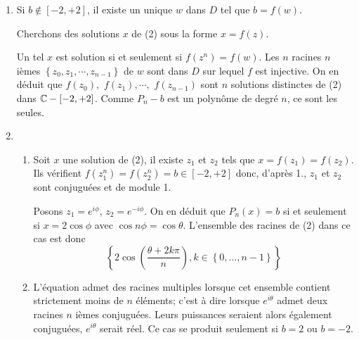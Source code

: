 \begin{enumerate}
\item  Si $b\notin \left[ -2,+2\right] $, il existe un unique $w$ dans $D$ tel que $b=f(w)$.

Cherchons des solutions $x$ de (2) sous la forme $x=f(z)$.

Un tel $x$ est solution si et seulement si $f(z^{n})=f(w)$. Les $n$ racines $n$ i{\`e}mes $\left\{ z_{0},z_{1},\cdots ,z_{n-1}\right\} $ de $w$ sont dans $D$ sur lequel $f$ est injective$.$ On en d{\'e}duit que $%
f(z_{0}), $ $f(z_{1}),\cdots ,$ $f(z_{n-1})$ sont $n$ solutions distinctes
de (2) dans $\Bbb{C}-\left[ -2,+2\right] $. Comme $P_{n}-b$ est un
polyn{\^o}me de degr{\'e} $n$, ce sont les seules.

\item
\begin{enumerate}
\item  Soit $x$ une solution de (2), il existe $z_{1}$ et $z_{2}$ tels
que $x=f(z_{1})=f(z_{2})$. Ils v{\'e}rifient $f(z_{1}^{n})=f(z_{2}^{n})=b\in
\left[ -2,+2\right] $ donc, d'apr{\`e}s 1., $z_{1}$ et $z_{2}$ sont
conjugu{\'e}es et de module 1$.$

Posons $z_{1}=e^{i\phi }$, $z_{2}=e^{-i\phi
}$. On en d{\'e}duit que $P_{n}(x)=b$ si et seulement si $x=2\cos \phi $
avec $\cos n\phi =\cos \theta $. L'ensemble des racines de (2) dans ce
cas est donc
\[
\left\{ 2\cos \left( \frac{\theta +2k\pi }{n}\right) ,k\in \left\{ 0,\ldots
,n-1\right\} \right\}
\]

\item  L'{\'e}quation admet des racines multiples lorsque cet ensemble
contient strictement moins de $n$ {\'e}l{\'e}ments; c'est {\`a} dire lorsque
$e^{i\theta }$ admet deux racines $n$ i{\`e}mes conjugu{\'e}es$.$ Leurs
puissances seraient alors {\'e}galement conjugu{\'e}es, $e^{i\theta }$
serait r{\'e}el. Ce cas se produit seulement si $b=2$ ou $b=-2$.
\end{enumerate}
\end{enumerate}
